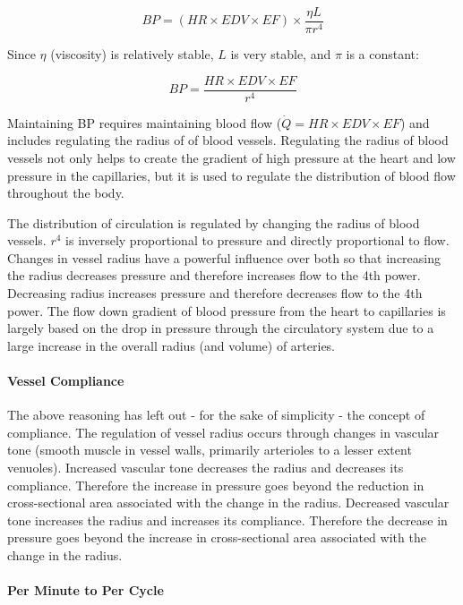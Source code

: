 \begin{equation}
    BP = (HR \times EDV \times EF) \times \frac{\eta L}{\pi r^4}
\end{equation}

Since $\eta$ (viscosity) is relatively stable, $L$ is very stable, and $\pi$ is a constant:

\begin{equation}
    BP = \frac{HR \times EDV \times EF}{r^4} 
    \label{BP_expanded}
\end{equation}

Maintaining BP requires maintaining blood flow ($\dot{Q} = HR \times EDV \times EF$) and includes regulating the radius of of blood vessels. Regulating the radius of blood vessels not only helps to create the gradient of high pressure at the heart and low pressure in the capillaries, but it is used to regulate the distribution of blood flow throughout the body.

The distribution of circulation is regulated by changing the radius of blood vessels. $r^4$ is inversely proportional to pressure and directly proportional to flow. Changes in vessel radius have a powerful influence over both so that increasing the radius decreases pressure and therefore increases flow to the 4th power. Decreasing radius increases pressure and therefore decreases flow to the 4th power. The flow down gradient of blood pressure from the heart to capillaries is largely based on the drop in pressure through the circulatory system due to a large increase in the overall radius (and volume) of arteries.

\paragraph{Vessel Compliance}

The above reasoning has left out - for the sake of simplicity - the concept of compliance. The regulation of vessel radius occurs through changes in vascular tone (smooth muscle in vessel walls, primarily arterioles to a lesser extent venuoles). Increased vascular tone decreases the radius and decreases its compliance. Therefore the increase in pressure goes beyond the reduction in cross-sectional area associated with the change in the radius. Decreased vascular tone increases the radius and increases its compliance. Therefore the decrease in pressure goes beyond the increase in cross-sectional area associated with the change in the radius. 

\paragraph{Per Minute to Per Cycle}

